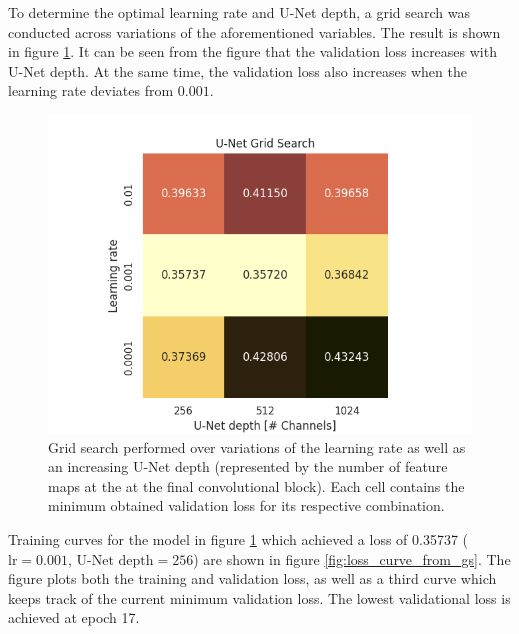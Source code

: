 \documentclass[../main/thesis]{subfiles}
\begin{document}
To determine the optimal learning rate and U-Net depth, a grid search was conducted across variations of the aforementioned variables. The result is shown in figure \ref{fig:gs}. It can be seen from the figure that the validation loss increases with U-Net depth. At the same time, the validation loss also increases when the learning rate deviates from $0.001$.

\begin{figure}
    \centering
    \includegraphics[width=.8\textwidth]{grid_search}
    \caption{\label{fig:gs}Grid search performed over variations of the learning rate as well as an increasing U-Net depth (represented by the number of feature maps at the at the final convolutional block). Each cell contains the minimum obtained validation loss for its respective combination.}
\end{figure}

Training curves for the model in figure \ref{fig:gs} which achieved a loss of 0.35737 ($\text{lr} = 0.001$, $\text{U-Net depth} = 256$) are shown in figure \ref{fig:loss_curve_from_gs}. The figure plots both the training and validation loss, as well as a third curve which keeps track of the current minimum validation loss. The lowest validational loss is achieved at epoch 17. 
\end{document}
